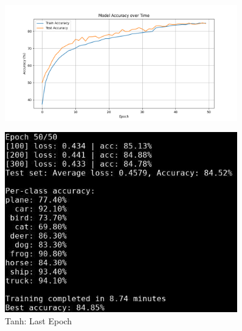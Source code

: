 \begin{frame}
\begin{columns}
    \begin{column}{0.5\textwidth}
        \begin{figure}[t]
            \centering
            \vspace{-0.4cm}
            \includegraphics[width=0.9\textwidth]{media/1stAssignment/cifar10_cnn_tanh_accuracy.png}
        \end{figure}
        \vspace{-0.8cm}
        \begin{figure}[t]
            \centering
            \includegraphics[width=0.9\textwidth]{media/1stAssignment/cnn_tanh_epoch_50.png}
            \vspace{-0.3cm}
            \caption{Tanh: Last Epoch}
        \end{figure}
    \end{column}    
\end{columns}
\end{frame}

